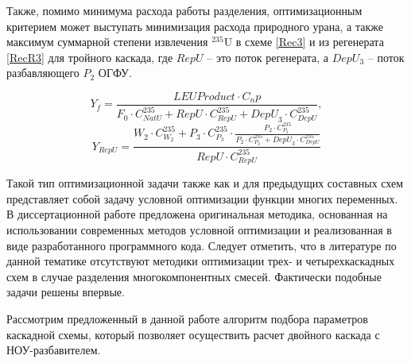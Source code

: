 Также, помимо минимума расхода работы разделения, оптимизационным критерием может выступать минимизация расхода природного урана, а также максимум суммарной степени извлечения $^{235}$U в схеме \ref{Rec3} и из регенерата \ref{RecR3} для тройного каскада, где $RepU$ -- это поток регенерата, а $DepU_{3}$ -- поток разбавляющего $P_2$ ОГФУ.

\begin{equation} \label{Rec3} 
    Y_{f} = \frac{LEU Product \cdot C_np}{F_0 \cdot C_{NatU}^{235} + RepU \cdot C_{RepU}^{235} + {DepU}_3 \cdot C_{DepU}^{235}},
\end{equation} 
\begin{equation} \label{RecR3} 
    Y_{RepU} = \frac{W_2\cdot C_{W_2}^{235}+P_3\cdot C_{P_3}^{235}\cdot \frac{P_2\cdot C_{P_2}^{235}}{P_2\cdot C_{P_2}^{235}+ {DepU}_3 \cdot C_{DepU}^{235}}}{RepU \cdot C_{RepU}^{235}}        
\end{equation} 

Такой тип оптимизационной задачи также как и для предыдущих составных схем представляет собой задачу условной оптимизации функции многих переменных. В диссертационной работе предложена оригинальная методика, основанная на использовании современных методов условной оптимизации и реализованная в виде разработанного программного кода.
Следует отметить, что в литературе по данной тематике отсутствуют методики оптимизации трех- и четырехкаскадных схем в случае разделения многокомпонентных смесей. Фактически подобные задачи решены впервые.

Рассмотрим предложенный в данной работе алгоритм подбора параметров каскадной схемы, который позволяет осуществить расчет двойного каскада с НОУ-разбавителем.

